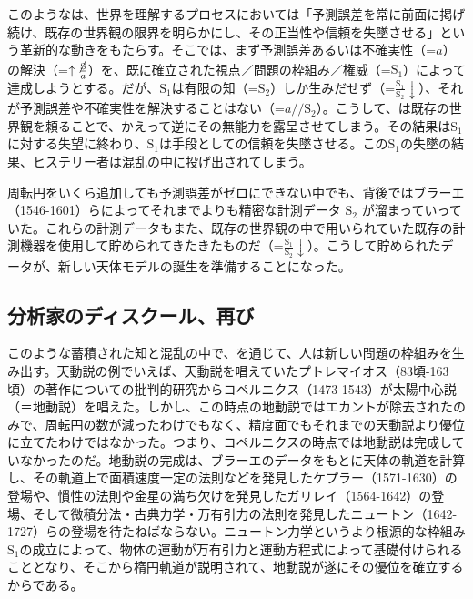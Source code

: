 このようなは、世界を理解するプロセスにおいては「予測誤差を常に前面に掲げ続け、既存の世界観の限界を明らかにし、その正当性や信頼を失墜させる」という革新的な動きをもたらす。そこでは、まず予測誤差あるいは不確実性（=\(a\)）の解決（=\(\uparrow\frac{\cancel{\textrm{S}}}{a}\)）を、既に確立された視点／問題の枠組み／権威（=\(\textrm{S}_1\)）によって達成しようとする。だが、\(\textrm{S}_1\)は有限の知（=\(\textrm{S}_2\)）しか生みだせず（=\(\frac{\textrm{S}_1}{\textrm{S}_2}\downarrow\)）、それが予測誤差や不確実性を解決することはない（=\(a//\textrm{S}_2\)）。こうして、は既存の世界観を頼ることで、かえって逆にその無能力を露呈させてしまう。その結果は\(\textrm{S}_1\)に対する失望に終わり、\(\textrm{S}_1\)は手段としての信頼を失墜させる。この\(\textrm{S}_1\)の失墜の結果、ヒステリー者は混乱の中に投げ出されてしまう。

周転円をいくら追加しても予測誤差がゼロにできない中でも、背後ではブラーエ（1546-1601）らによってそれまでよりも精密な計測データ
\(\textrm{S}_2\)
が溜まっていっていた。これらの計測データもまた、既存の世界観の中で用いられていた既存の計測機器を使用して貯められてきたきたものだ（=\(\frac{\textrm{S}_1}{\textrm{S}_2}\downarrow\)）。こうして貯められたデータが、新しい天体モデルの誕生を準備することになった。

\subsection{分析家のディスクール、再び}\label{ux5206ux6790ux5bb6ux306eux30c7ux30a3ux30b9ux30afux30fcux30ebux518dux3073}

このような蓄積された知と混乱の中で、を通じて、人は新しい問題の枠組みを生み出す。天動説の例でいえば、天動説を唱えていたプトレマイオス（83頃-163頃）の著作についての批判的研究からコペルニクス（1473-1543）が太陽中心説（＝地動説）を唱えた。しかし、この時点の地動説ではエカントが除去されたのみで、周転円の数が減ったわけでもなく、精度面でもそれまでの天動説より優位に立てたわけではなかった。つまり、コペルニクスの時点では地動説は完成していなかったのだ。地動説の完成は、ブラーエのデータをもとに天体の軌道を計算し、その軌道上で面積速度一定の法則などを発見したケプラー（1571-1630）の登場や、慣性の法則や金星の満ち欠けを発見したガリレイ（1564-1642）の登場、そして微積分法・古典力学・万有引力の法則を発見したニュートン（1642-1727）らの登場を待たねばならない。ニュートン力学というより根源的な枠組み\(\textrm{S}_1\)の成立によって、物体の運動が万有引力と運動方程式によって基礎付けられることとなり、そこから楕円軌道が説明されて、地動説が遂にその優位を確立するからである。

